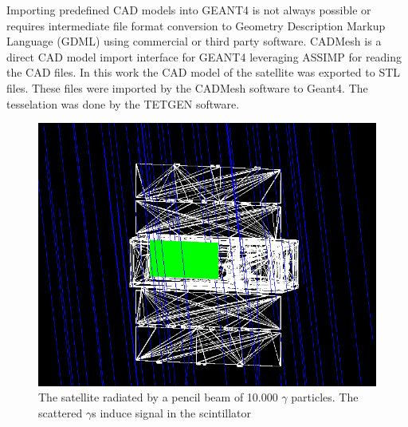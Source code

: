 \documentclass[12pt, a4paper,titlepage]{article}
\numberwithin{equation}{section}
\numberwithin{figure}{section}
\begin{document}
Importing predefined CAD models into GEANT4 is not always possible or requires intermediate file format conversion to Geometry Description Markup Language (GDML) using commercial or third party software. CADMesh \cite{cadmesh} is a direct CAD model import interface for GEANT4 leveraging ASSIMP \cite{assimp} for reading the CAD files. In this work the CAD model of the satellite was exported to STL files. These files were imported by the CADMesh software to Geant4. The tesselation was done by the TETGEN \cite{tetgen} software.

\begin{figure}[h!]
\includegraphics[width=150.0mm]{images/satellite_rad.png}
\caption{The satellite radiated by a pencil beam of 10.000 $\gamma$ particles. The scattered $\gamma$s induce signal in the scintillator}
\end{figure}
\end{document}
